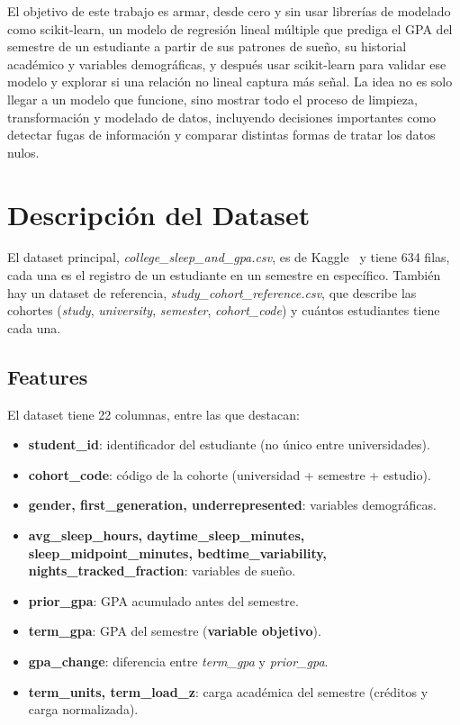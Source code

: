 \documentclass[10pt,twocolumn]{article}
\begin{document}
El objetivo de este trabajo es armar, desde cero y sin usar librerías de modelado como scikit-learn, un modelo de regresión lineal múltiple que prediga el GPA del semestre de un estudiante a partir de sus patrones de sueño, su historial académico y variables demográficas, y después usar scikit-learn para validar ese modelo y explorar si una relación no lineal captura más señal. La idea no es solo llegar a un modelo que funcione, sino mostrar todo el proceso de limpieza, transformación y modelado de datos, incluyendo decisiones importantes como detectar fugas de información y comparar distintas formas de tratar los datos nulos.

\section{Descripción del Dataset}

El dataset principal, \textit{college\_sleep\_and\_gpa.csv}, es de Kaggle~\cite{kaggle_dataset} y tiene 634 filas, cada una es el registro de un estudiante en un semestre en específico. También hay un dataset de referencia, \textit{study\_cohort\_reference.csv}, que describe las cohortes (\textit{study}, \textit{university}, \textit{semester}, \textit{cohort\_code}) y cuántos estudiantes tiene cada una.

\subsection{Features}

El dataset tiene 22 columnas, entre las que destacan:

\begin{itemize}
  \setlength\itemsep{0.1em}
  \item \textbf{student\_id}: identificador del estudiante (no único entre universidades).
  \item \textbf{cohort\_code}: código de la cohorte (universidad + semestre + estudio).
  \item \textbf{gender, first\_generation, underrepresented}: variables demográficas.
  \item \textbf{avg\_sleep\_hours, daytime\_sleep\_minutes, sleep\_midpoint\_minutes, bedtime\_variability, nights\_tracked\_fraction}: variables de sueño.
  \item \textbf{prior\_gpa}: GPA acumulado antes del semestre.
  \item \textbf{term\_gpa}: GPA del semestre (\textbf{variable objetivo}).
  \item \textbf{gpa\_change}: diferencia entre \textit{term\_gpa} y \textit{prior\_gpa}.
  \item \textbf{term\_units, term\_load\_z}: carga académica del semestre (créditos y carga normalizada).
\end{itemize}
\end{document}
